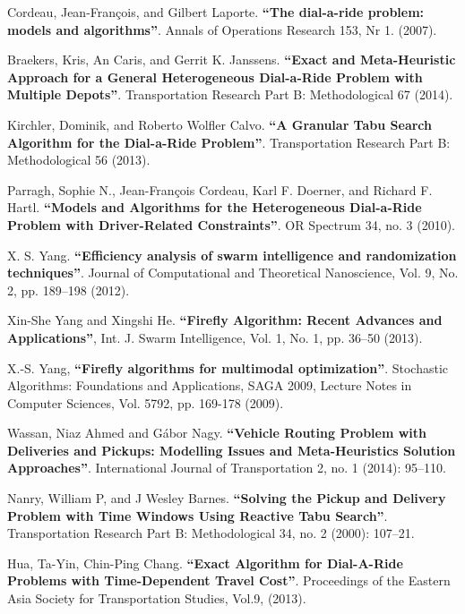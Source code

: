 \documentclass{article}
\begin{document}
\begin{thebibliography}{1}

Cordeau, Jean-François, and Gilbert Laporte. \textbf{“The dial-a-ride problem: models and algorithms”}. Annals of Operations Research 153, Nr 1. (2007).

Braekers, Kris, An Caris, and Gerrit K. Janssens. \textbf{“Exact and Meta-Heuristic Approach for a General Heterogeneous Dial-a-Ride Problem with Multiple Depots”}. Transportation Research Part B: Methodological 67 (2014).

Kirchler, Dominik, and Roberto Wolfler Calvo. \textbf{“A Granular Tabu Search Algorithm for the Dial-a-Ride Problem”}. Transportation Research Part B: Methodological 56 (2013).

Parragh, Sophie N., Jean-François Cordeau, Karl F. Doerner, and Richard F. Hartl. \textbf{“Models and Algorithms for the Heterogeneous Dial-a-Ride Problem with Driver-Related Constraints”}. OR Spectrum 34, no. 3 (2010).

X. S. Yang. \textbf{“Efficiency analysis of swarm intelligence and randomization techniques”}. Journal of Computational and Theoretical Nanoscience, Vol. 9, No. 2, pp. 189–198 (2012).

Xin-She Yang and Xingshi He. \textbf{“Firefly Algorithm: Recent Advances and Applications”}, Int. J. Swarm Intelligence,
Vol. 1, No. 1, pp. 36–50 (2013).

X.-S. Yang, \textbf{“Firefly algorithms for multimodal optimization”}. Stochastic Algorithms: Foundations and Applications, SAGA 2009,
Lecture Notes in Computer Sciences, Vol. 5792, pp. 169-178 (2009).

Wassan, Niaz Ahmed and Gábor Nagy. \textbf{“Vehicle Routing Problem with Deliveries and Pickups: Modelling Issues and Meta-Heuristics Solution Approaches”}. International Journal of Transportation 2, no. 1 (2014): 95–110.

Nanry, William P, and J Wesley Barnes. \textbf{“Solving the Pickup and Delivery Problem with Time Windows Using Reactive Tabu Search”}. Transportation Research Part B: Methodological 34, no. 2 (2000): 107–21.

Hua, Ta-Yin, Chin-Ping Chang. \textbf{“Exact Algorithm for Dial-A-Ride Problems with Time-Dependent Travel Cost”}. Proceedings of the Eastern Asia Society for Transportation Studies, Vol.9, (2013).


\end{thebibliography}
\end{document}
